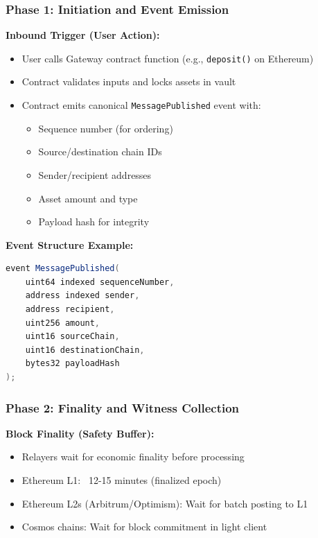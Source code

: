 \documentclass[11pt,a4paper]{article}
\begin{document}
\subsubsection*{Phase 1: Initiation and Event Emission}

\textbf{Inbound Trigger (User Action):}
\begin{itemize}
    \item User calls Gateway contract function (e.g., \texttt{deposit()} on Ethereum)
    \item Contract validates inputs and locks assets in vault
    \item Contract emits canonical \texttt{MessagePublished} event with:
        \begin{itemize}
            \item Sequence number (for ordering)
            \item Source/destination chain IDs
            \item Sender/recipient addresses
            \item Asset amount and type
            \item Payload hash for integrity
        \end{itemize}
\end{itemize}

\textbf{Event Structure Example:}
\begin{lstlisting}[language=Java, caption={Solidity Event Definition}]
event MessagePublished(
    uint64 indexed sequenceNumber,
    address indexed sender,
    address recipient,
    uint256 amount,
    uint16 sourceChain,
    uint16 destinationChain,
    bytes32 payloadHash
);
\end{lstlisting}

\subsubsection*{Phase 2: Finality and Witness Collection}

\textbf{Block Finality (Safety Buffer):}
\begin{itemize}
    \item Relayers wait for economic finality before processing
    \item Ethereum L1: ~12-15 minutes (finalized epoch)
    \item Ethereum L2s (Arbitrum/Optimism): Wait for batch posting to L1
    \item Cosmos chains: Wait for block commitment in light client
\end{itemize}
\end{document}
